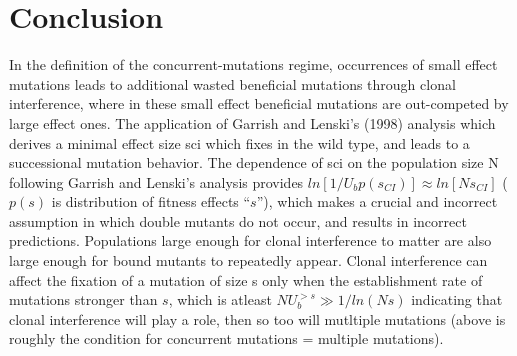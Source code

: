 \documentclass[12pt, one column]{article}
\begin{document}
\section*{Conclusion}
In the definition of the concurrent-mutations regime, occurrences of small effect mutations leads to additional wasted beneficial mutations through clonal interference, where in these small effect beneficial mutations are out-competed by large effect ones.  The application of Garrish and Lenski's (1998) analysis which derives a minimal effect size sci which fixes in the wild type, and leads to a successional mutation behavior.  The dependence of sci on the population size N following Garrish and Lenski's analysis provides $ln[1/U_b p(s_{CI})]\approx ln[Ns_{CI}]$ ($p(s)$ is distribution of fitness effects “$s$”), which makes a crucial and incorrect assumption in which double mutants do not occur, and results in incorrect predictions. Populations large enough for clonal interference to matter are also large enough for bound mutants to repeatedly appear.  Clonal interference can affect the fixation of a mutation of size s only when the establishment rate of  mutations stronger than $s$, which is atleast $NU_b^{>s} \gg 1/ln(Ns)$ indicating that clonal interference will play a role, then so too will mutltiple mutations (above is roughly the condition for concurrent mutations = multiple mutations). 



\end{document}
